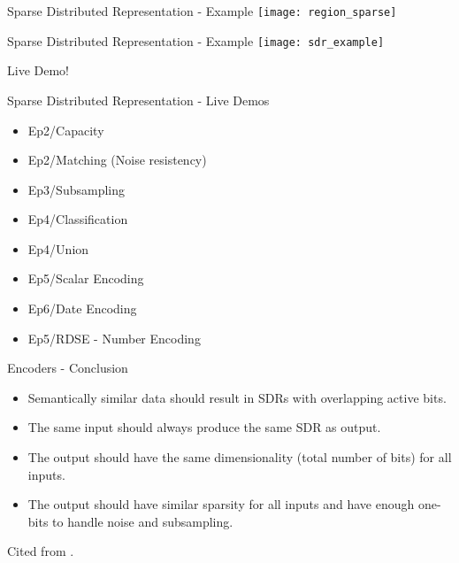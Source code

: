 \begin{frame}[c]{Sparse Distributed Representation - Example}
    \texttt{[image: region\_sparse]}
\end{frame}


\begin{frame}[c]{Sparse Distributed Representation - Example}
    \texttt{[image: sdr\_example]}
\end{frame}



\begin{frame}[c,standout]
    Live Demo!
\end{frame}


\begin{frame}[c]{Sparse Distributed Representation - Live Demos}
    \Large
    \begin{itemize}[<+(1)->]
        \item Ep2/Capacity
        \item Ep2/Matching (Noise resistency)
        \item Ep3/Subsampling
        \item Ep4/Classification
        \item Ep4/Union
        \item Ep5/Scalar Encoding
        \item Ep6/Date Encoding
        \item Ep5/RDSE - Number Encoding
    \end{itemize}
\end{frame}


\begin{frame}[c]{Encoders - Conclusion}
    \begin{itemize}[<+(1)->]
        \item Semantically similar data should result in SDRs with overlapping active bits.
        \item The same input should always produce the same SDR as output.
        \item The output should have the same dimensionality (total number of bits) for all inputs.
        \item The output should have similar sparsity for all inputs and have enough one-bits to handle noise and subsampling.
    \end{itemize}

    \normalsize
    \pause
    Cited from \cite{hawkins2016book}.
\end{frame}

